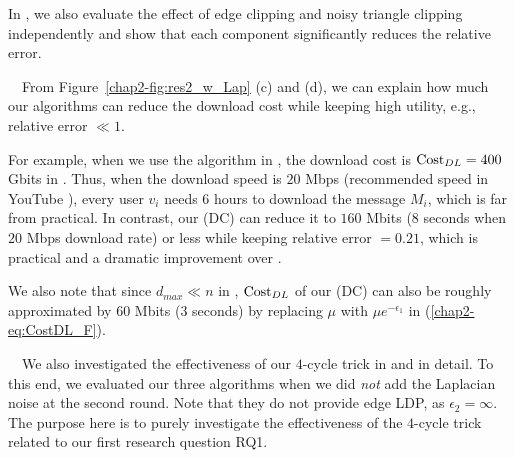 In , we also evaluate the effect of edge clipping and noisy triangle clipping independently and show that each component significantly reduces the relative error. 

\smallskip
{}~~From Figure~\ref{chap2-fig:res2_w_Lap} (c) and (d), we can explain how much our algorithms can reduce the download cost while keeping high utility, e.g., relative error $\ll 1$. 

For example, when we use the algorithm in \cite{Imola_USENIX21}, the download cost is 
$\mathrm{Cost}_{DL} = 400$ Gbits in \IMDB{}. 
Thus, when the download speed is $20$ Mbps 
(recommended speed in YouTube \cite{YouTube_speed}), every user $v_i$ needs 6 hours to download the message $M_i$, which is far from practical. 
In contrast, our \AlgTwo{} (DC) can reduce it to 
$160$ 
Mbits (8 seconds when $20$ Mbps download rate) or less 
while keeping relative error $= 0.21$, 
which is practical and a dramatic improvement over \cite{Imola_USENIX21}. 

We also note that since $d_{max} \ll n$ in \IMDB{}, 
$\mathrm{Cost}_{DL}$ of our \AlgTwo{} (DC) 
can also be roughly approximated by $60$ Mbits (3 seconds) by replacing $\mu$ with $\mu e^{-\epsilon_1}$ in 
(\ref{chap2-eq:CostDL_F}). 


\smallskip
~~We 
also investigated 
the effectiveness of our $4$-cycle trick in \AlgTwo{} and \AlgThree{} 
in detail. 
To this end, we evaluated our three algorithms when we did \textit{not} add the Laplacian noise at the second round. 
Note that they do not provide edge LDP, as $\epsilon_2 = \infty$. 
The purpose here is to purely investigate the effectiveness of the $4$-cycle trick 
related to our first research question RQ1. 

